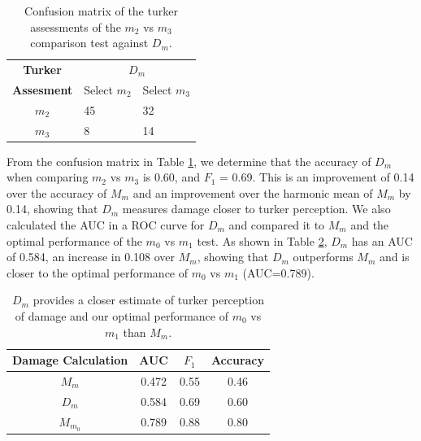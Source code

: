 \begin{table}
\centering
\begin{tabular}{cll}
\textbf{Turker} & \multicolumn{2}{c}{ \textbf{ $D_{m}$}}                           \\
\textbf{Assesment}                  &          Select $m_{2}$             &           Select $m_{3}$             \\ \cline{2-3} 
       $m_{2}$           & \multicolumn{1}{|l}{45} & \multicolumn{1}{|l|}{32} \\ \cline{2-3} 
       $m_{3}$           & \multicolumn{1}{|l}{8} & \multicolumn{1}{|l|}{14} \\ \cline{2-3} 
\end{tabular}
  \caption{Confusion matrix of the turker assessments of the $m_2$ vs $m_3$ comparison test against $D_m$.}
  \label{m2cm}
\end{table}





From the confusion matrix in Table \ref{m2cm}, we determine that the accuracy of $D_m$ when comparing $m_2$ vs $m_3$ is 0.60, and $F_1$ = 0.69. This is an improvement of 0.14 over the accuracy of $M_m$ and an improvement over the harmonic mean of $M_m$ by 0.14, showing that $D_m$ measures damage closer to turker perception. 
We also calculated the AUC in a ROC curve for $D_m$ and compared it to $M_m$ and the optimal performance of the $m_0$ vs $m_1$ test. As shown in Table \ref{auc2}, $D_m$ has an AUC of 0.584, an increase in 0.108 over $M_m$, showing that $D_m$ outperforms $M_m$ and is closer to the optimal performance of $m_0$ vs $m_1$ (AUC=0.789).


\begin{table}
\centering
\begin{tabular}{ c | c | c | c }
    Damage Calculation &  AUC & $F_1$ & Accuracy\\
\hline
  $M_m$ & 0.472 & 0.55 & 0.46 \\
  $D_m$ & 0.584 & 0.69 & 0.60 \\
  $M_{m_0}$ & 0.789 & 0.88  & 0.80 \\
\hline
\end{tabular}
  \caption{$D_m$ provides a closer estimate of turker perception of damage and our optimal performance of $m_0$ vs $m_1$ than $M_m$.}
  \label{auc2}
\end{table}

